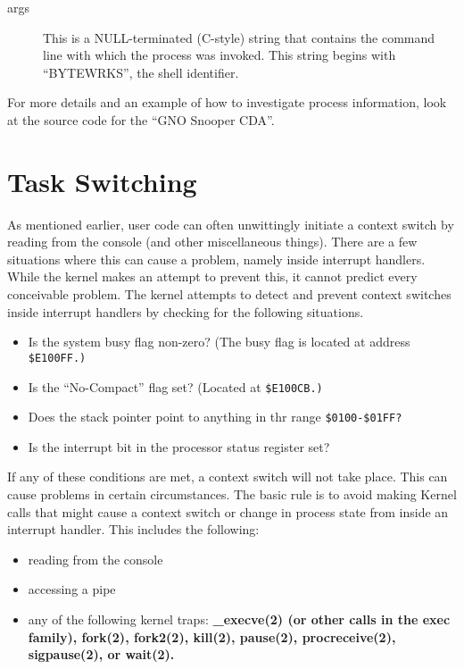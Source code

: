 \documentclass{report}
\begin{document}
\begin{description}
\item[args]
This is a NULL-terminated (C-style) string that contains the command line
with which the process was invoked.  This string begins with
``BYTEWRKS'', the shell identifier.

\end{description}

For more details and an example of how to
investigate process information, look at the source code for the 
``GNO Snooper CDA''.

\section{Task Switching}


As mentioned earlier, user code can often
unwittingly initiate a context switch by reading from the console
(and other miscellaneous things). There are a few situations
where this can cause a problem, namely inside interrupt handlers.
While the kernel makes an attempt to prevent this, it cannot
predict every conceivable problem. The kernel attempts to detect
and prevent context switches inside interrupt handlers by
checking for the following situations.

\begin{itemize}
\item	Is the system busy flag non-zero?  (The busy flag is located at
	address \tt \$E100FF\rm.)

\item	Is the ``No-Compact'' flag set? (Located at \tt\$E100CB\rm.)

\item	Does the stack pointer point to anything in thr range 
	\tt \$0100-\$01FF\rm?

\item	Is the interrupt bit in the processor status register set?
\end{itemize}

If any of these conditions are met, a
context switch will not take place. This can cause problems in
certain circumstances. The basic rule is to avoid making Kernel
calls that might cause a context switch or change in process
state from inside an interrupt handler. This includes the
following:

\begin{itemize}
\item	reading from the console
\item	accessing a pipe
\item	any of the following kernel traps:
	\bf \_{}execve\rm(2) (or other calls in the \bf exec \rm family),
	\bf fork\rm(2),
	\bf fork2\rm(2),
	\bf kill\rm(2),
	\bf pause\rm(2),
	\bf procreceive\rm(2),
	\bf sigpause\rm(2),
	or
	\bf wait\rm(2).
\end{itemize}
\end{document}
